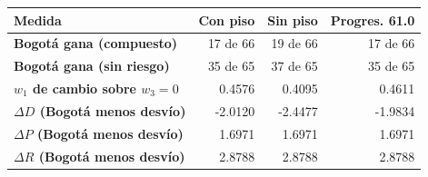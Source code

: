 \renewcommand{\arraystretch}{1.2}
\begin{tabular}{|l|r|r|r|}
\hline
\rowcolor{gray!20} \textbf{Medida} & \textbf{Con piso} & \textbf{Sin piso} & \textbf{Progres. 61.0} \\
\hline
\textbf{Bogotá gana (compuesto)} & 17 de 66 & 19 de 66 & 17 de 66 \\
\hline
\textbf{Bogotá gana (sin riesgo)} & 35 de 65 & 37 de 65 & 35 de 65 \\
\hline
\textbf{$w_1$ de cambio sobre $w_3=0$} & 0.4576 & 0.4095 & 0.4611 \\
\hline
\textbf{$\Delta D$ (Bogotá menos desvío)} & -2.0120 & -2.4477 & -1.9834 \\
\hline
\textbf{$\Delta P$ (Bogotá menos desvío)} & 1.6971 & 1.6971 & 1.6971 \\
\hline
\textbf{$\Delta R$ (Bogotá menos desvío)} & 2.8788 & 2.8788 & 2.8788 \\
\hline
\end{tabular}
